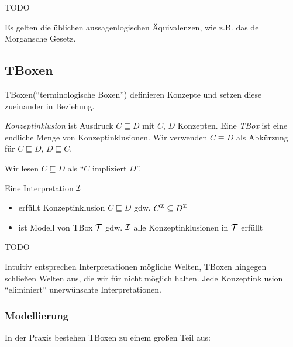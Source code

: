 \begin{tafel}
    TODO
\end{tafel}

Es gelten die üblichen aussagenlogischen Äquivalenzen, wie z.B. das de
Morgansche Gesetz.

\subsection{TBoxen}\label{tboxen}
\label{sec:tbox}

TBoxen(\enquote{terminologische Boxen}) definieren Konzepte und setzen diese zueinander in Beziehung.

\begin{definition}
\emph{Konzeptinklusion} ist Ausdruck $C \sqsubseteq D$ mit $C$, $D$ Konzepten.
Eine \emph{TBox} ist eine endliche Menge von Konzeptinklusionen.  Wir
verwenden $C \equiv D$ als Abkürzung für $C \sqsubseteq D$, $D \sqsubseteq C$.
\end{definition}
Wir lesen $C \sqsubseteq D$ als \enquote{$C$ impliziert $D$}.

\begin{definition} 
Eine Interpretation $\mathcal{I}$
\begin{itemize}
\item
  erfüllt Konzeptinklusion $C \sqsubseteq D$ gdw.
  $C^{\mathcal{I}} \subseteq D^{\mathcal{I}}$
\item
  ist Modell von TBox $\mathcal{T}$ gdw. $\mathcal{I}$ alle Konzeptinklusionen in $\mathcal{T}$
  erfüllt
\end{itemize}
\end{definition}

\begin{tafel}
    TODO
\end{tafel}

Intuitiv entsprechen Interpretationen mögliche Welten, TBoxen hingegen schließen Welten aus, die wir für nicht möglich halten. Jede Konzeptinklusion \enquote{eliminiert} unerwünschte Interpretationen.

\subsubsection{Modellierung}\label{modellierung}

In der Praxis bestehen TBoxen zu einem großen Teil aus:

